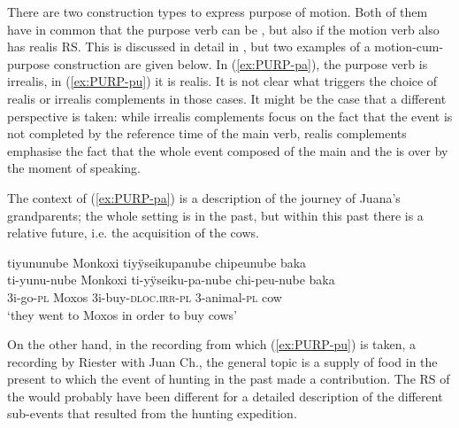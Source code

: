 %
%
There are two construction types to express purpose of motion. Both of them have in common that the purpose verb can be , but also  if the motion verb also has realis RS. This is discussed in detail in , but two examples of a motion-cum-purpose construction are given below. In (\ref{ex:PURP-pa}), the purpose verb is irrealis, in (\ref{ex:PURP-pu}) it is realis. It is not clear what triggers the choice of realis or irrealis complements in those cases. It might be the case that a different perspective is taken: while irrealis complements focus on the fact that the event is not completed by the reference time of the main verb, realis complements emphasise the fact that the whole event composed of the main and the  is over by the moment of speaking.

The context of (\ref{ex:PURP-pa}) is a description of the journey of Juana’s grandparents; the whole setting is in the past, but within this past there is a relative future, i.e. the acquisition of the cows.

\ea\label{ex:PURP-pa}
\begingl 
\glpreamble tiyununube Monkoxi tiyÿseikupanube chipeunube baka\\
\gla ti-yunu-nube Monkoxi ti-yÿseiku-pa-nube chi-peu-nube baka\\ 
\glb 3i-go-\textsc{pl} Moxos 3i-buy-\textsc{dloc.irr}-\textsc{pl} 3-animal-\textsc{pl} cow\\ 
\glft ‘they went to Moxos in order to buy cows’\\ 
\endgl
 \trailingcitation{[jxx-p151016l-2]}
\xe
{}

On the other hand, in the recording from which (\ref{ex:PURP-pu}) is taken, a recording by Riester with Juan Ch., the general topic is a supply of food in the present to which the event of hunting in the past made a contribution. The RS of the  would probably have been different for a detailed description of the different sub-events that resulted from the hunting expedition.

